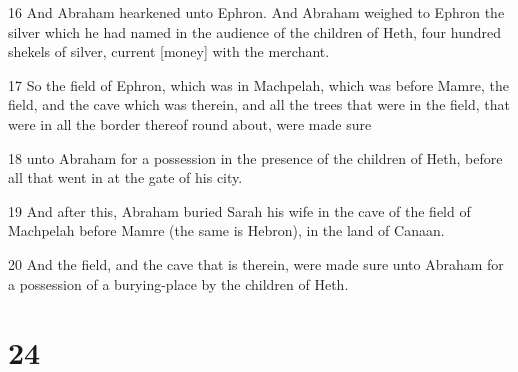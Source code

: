 \par 16 And Abraham hearkened unto Ephron. And Abraham weighed to Ephron the silver which he had named in the audience of the children of Heth, four hundred shekels of silver, current [money] with the merchant.
\par 17 So the field of Ephron, which was in Machpelah, which was before Mamre, the field, and the cave which was therein, and all the trees that were in the field, that were in all the border thereof round about, were made sure
\par 18 unto Abraham for a possession in the presence of the children of Heth, before all that went in at the gate of his city.
\par 19 And after this, Abraham buried Sarah his wife in the cave of the field of Machpelah before Mamre (the same is Hebron), in the land of Canaan.
\par 20 And the field, and the cave that is therein, were made sure unto Abraham for a possession of a burying-place by the children of Heth.

\chapter{24}

